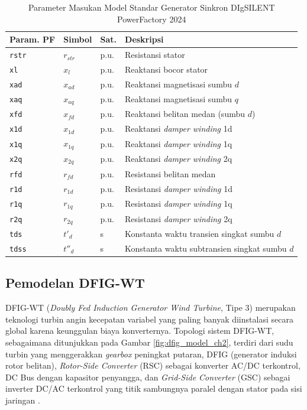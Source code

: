 \begin{table}[H]
\centering
\caption[Parameter Masukan Model Standar Generator Sinkron DIgSILENT PowerFactory 2024]{Parameter Masukan Model Standar Generator Sinkron DIgSILENT PowerFactory 2024
\cite{digsilent2024sm}}
\label{tab:sg-pf-params}
\small
\begin{tabular}{p{1.8cm} p{1.4cm} p{0.9cm} p{8.1cm}}
\toprule
\textbf{Param. PF} & \textbf{Simbol} & \textbf{Sat.} & \textbf{Deskripsi} \\
\midrule
\texttt{rstr} & $r_{str}$ & p.u. & Resistansi stator \\
\texttt{xl}   & $x_l$    & p.u. & Reaktansi bocor stator \\
\texttt{xad}  & $x_{ad}$ & p.u. & Reaktansi magnetisasi sumbu $d$ \\
\texttt{xaq}  & $x_{aq}$ & p.u. & Reaktansi magnetisasi sumbu $q$ \\
\texttt{xfd}  & $x_{fd}$ & p.u. & Reaktansi belitan medan (sumbu $d$) \\
\texttt{x1d}  & $x_{1d}$ & p.u. & Reaktansi \textit{damper winding} 1d \\
\texttt{x1q}  & $x_{1q}$ & p.u. & Reaktansi \textit{damper winding} 1q \\
\texttt{x2q}  & $x_{2q}$ & p.u. & Reaktansi \textit{damper winding} 2q \\
\texttt{rfd}  & $r_{fd}$ & p.u. & Resistansi belitan medan \\
\texttt{r1d}  & $r_{1d}$ & p.u. & Resistansi \textit{damper winding} 1d \\
\texttt{r1q}  & $r_{1q}$ & p.u. & Resistansi \textit{damper winding} 1q \\
\texttt{r2q}  & $r_{2q}$ & p.u. & Resistansi \textit{damper winding} 2q \\
\texttt{tds}  & $t'_d$   & s    & Konstanta waktu transien singkat sumbu $d$ \\
\texttt{tdss} & $t''_d$  & s    & Konstanta waktu subtransien singkat sumbu $d$ \\
\bottomrule
\end{tabular}
\end{table}

\subsection{Pemodelan DFIG-WT}

DFIG-WT (\textit{Doubly Fed Induction Generator Wind Turbine}, Tipe 3) merupakan
teknologi turbin angin kecepatan variabel yang paling banyak diinstalasi secara
global karena keunggulan biaya konverternya. Topologi sistem DFIG-WT, sebagaimana
ditunjukkan pada Gambar \ref{fig:dfig_model_ch2}, terdiri dari sudu turbin yang
menggerakkan \textit{gearbox} peningkat putaran, DFIG (generator induksi rotor
belitan), \textit{Rotor-Side Converter} (RSC) sebagai konverter AC/DC terkontrol,
DC Bus dengan kapasitor penyangga, dan \textit{Grid-Side Converter} (GSC) sebagai
inverter DC/AC terkontrol yang titik sambungnya paralel dengan stator pada sisi
jaringan \cite{doublyfedinduction}.

